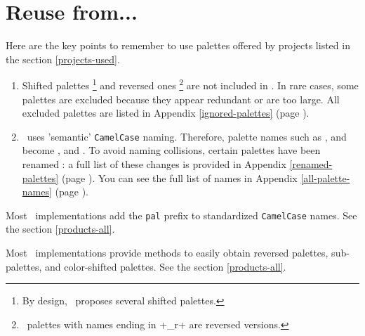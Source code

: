 \documentclass{tutodoc}
\begin{document}
\section{Reuse from...}

Here are the key points to remember to use palettes offered by projects listed in the section \ref{projects-used}.
%
\begin{enumerate}
    \item Shifted palettes%
    \footnote{
        By design, \ proposes several shifted palettes.
}
    and reversed ones%
    \footnote{
        \matplotlib\ palettes with names ending in +_r+ are reversed versions.
}
    are not included in \thisproj.
    In rare cases, some palettes are excluded because they appear redundant or are too large.
    All excluded palettes are listed in Appendix \ref{ignored-palettes} (page \pageref{ignored-palettes}).


	\item
	\thisproj\ uses 'semantic' \verb+CamelCase+ naming. Therefore, palette names such as
	,  and 
	become
	,  and .
	To avoid naming collisions, certain palettes have been renamed : a full list of these changes is provided in Appendix \ref{renamed-palettes} (page \pageref{renamed-palettes}).
	You can see the full list of names in Appendix \ref{all-palette-names} (page \pageref{all-palette-names}).
\end{enumerate}




\begin{tdoccaut}
    Most \thisproj\ implementations add the \verb+pal+ prefix to standardized \verb+CamelCase+ names.
    See the section \ref{products-all}.
\end{tdoccaut}


\begin{tdocnote}
    Most \thisproj\ implementations provide methods to easily obtain reversed palettes, sub-palettes, and color-shifted palettes.
    See the section \ref{products-all}.
\end{tdocnote}
\end{document}
